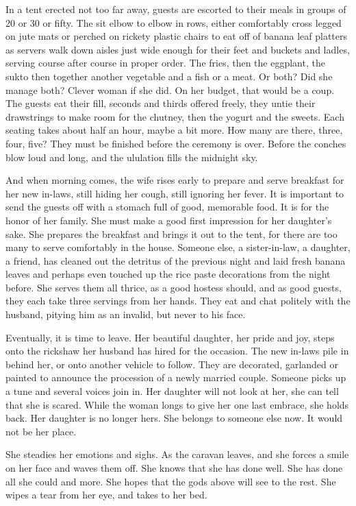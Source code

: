 \documentclass{amsart}
\newcommand{\egnote}{\todo[color=violet!30]}
\begin{document}
In a tent erected not too far away, guests are escorted to their meals in groups of 20\egnote{all digits or all words?} or 30 or fifty. The sit elbow to elbow in rows, either comfortably cross legged on jute mats or perched on rickety plastic chairs to eat off of banana leaf platters as servers walk down aisles just wide enough for their feet and buckets and ladles, serving course after course in proper order. The fries, then the eggplant, the sukto then together another vegetable and a fish or a meat. Or both? Did she manage both? Clever woman if she did. On her budget, that would be a coup. The guests eat their fill, seconds and thirds offered freely, they untie their drawstrings to make room for the chutney, then the yogurt and the sweets. Each seating takes about half an hour, maybe a bit more. How many are there, three, four, five? They must be finished before the ceremony is over. Before the conches blow loud and long, and the ululation fills the midnight sky. 

And when morning comes, the wife rises early to prepare and serve breakfast for her new in-laws, still hiding her cough, still ignoring her fever. It is important to send the guests off with a stomach full of good, memorable food. It is for the honor of her family. She must make a good first impression for her daughter's sake. She prepares the breakfast and brings it out to the tent, for there are too many to serve comfortably in the house. Someone else, a sister-in-law, a daughter, a friend, has cleaned out the detritus of the previous night and laid fresh banana leaves and perhaps even touched up the rice paste decorations from the night before. She serves them all thrice, as a good hostess should, and as good guests, they each take three servings from her hands. They eat and chat politely with the husband, pitying him as an invalid, but never to his face. 

Eventually, it is time to leave. Her beautiful daughter, her pride and joy, steps onto the rickshaw her husband has hired for the occasion. The new in-laws pile in behind her, or onto another vehicle to follow. They are decorated, garlanded or painted to announce the procession of a newly married couple. Someone picks up a tune and several voices join in. Her daughter will not look at her, she can tell that she is scared. While the woman longs to give her one last embrace, she holds back. Her daughter is no longer hers. She belongs to someone else now. It would not be her place. 

She steadies her emotions and sighs. As the caravan leaves, and she forces a smile on her face and waves them off. She knows that she has done well. She has done all she could and more. She hopes that the gods above will see to the rest. She wipes a tear from her eye, and takes to her bed. 
\end{document}

